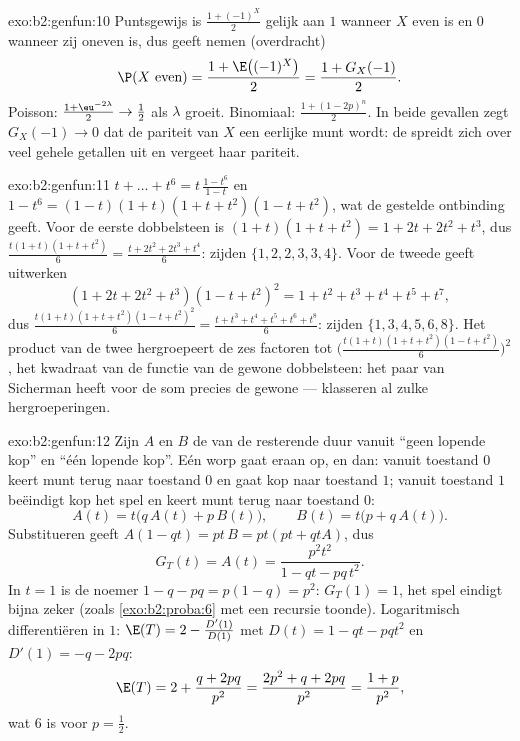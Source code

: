 \begin{solution}{exo:b2:genfun:10}
Puntsgewijs is $\frac{1 + (-1)^X}{2}$ gelijk aan $1$ wanneer $X$
even is en $0$ wanneer zij oneven is, dus geeft 
nemen (overdracht)
\[
\P(X \text{ even}) = \frac{1 + \E\bigl((-1)^X\bigr)}2 =
\frac{1 + G_X(-1)}2 .
\]
Poisson: $\frac{1 + \eu^{-2\lambda}}2 \to \frac12$ als $\lambda$
groeit. Binomiaal: $\frac{1 + (1 - 2p)^n}2$. In beide gevallen zegt
$G_X(-1) \to 0$ dat de pariteit van $X$ een eerlijke munt wordt: de
 spreidt zich over veel gehele getallen uit en vergeet
haar pariteit.
\end{solution}

\begin{solution}{exo:b2:genfun:11}
$t + \dots + t^6 = t\,\frac{1 - t^6}{1 - t}$ en $1 - t^6 = (1 -
t)(1 + t)(1 + t + t^2)(1 - t + t^2)$, wat de gestelde ontbinding
geeft. Voor de eerste dobbelsteen is $(1 + t)(1 + t + t^2) = 1 + 2t
+ 2t^2 + t^3$, dus $\frac{t(1+t)(1+t+t^2)}6 = \frac{t + 2t^2 +
2t^3 + t^4}6$: zijden $\{1, 2, 2, 3, 3, 4\}$. Voor de tweede geeft
uitwerken
\[
(1 + 2t + 2t^2 + t^3)(1 - t + t^2)^2 = 1 + t^2 + t^3 + t^4 +
t^5 + t^7,
\]
dus $\frac{t(1+t)(1+t+t^2)(1-t+t^2)^2}6 = \frac{t + t^3 + t^4 +
t^5 + t^6 + t^8}6$: zijden $\{1, 3, 4, 5, 6, 8\}$. Het product van
de twee  hergroepeert de zes factoren tot
$\bigl(\frac{t(1+t)(1+t+t^2)(1-t+t^2)}6 \bigr)^2$, het kwadraat van
de functie van de gewone dobbelsteen: het paar van Sicherman heeft
voor de som precies de gewone  --- 
klasseren al zulke hergroeperingen.
\end{solution}

\begin{solution}{exo:b2:genfun:12}
Zijn $A$ en $B$ de  van de resterende duur
vanuit ``geen lopende kop'' en ``één lopende kop''. Eén worp gaat
eraan op, en dan: vanuit toestand $0$ keert munt terug naar
toestand $0$ en gaat kop naar toestand $1$; vanuit toestand $1$
beëindigt kop het spel en keert munt terug naar toestand $0$:
\[
A(t) = t\bigl(q\,A(t) + p\,B(t)\bigr),
\qquad
B(t) = t\bigl(p + q\,A(t)\bigr).
\]
Substitueren geeft $A(1 - qt) = pt\,B = pt(pt + qtA)$, dus
\[
G_T(t) = A(t) = \frac{p^2t^2}{1 - qt - pq\,t^2} .
\]
In $t = 1$ is de noemer $1 - q - pq = p(1 - q) = p^2$: $G_T(1) =
1$, het spel eindigt bijna zeker (zoals \cref{exo:b2:proba:6} met
een recursie toonde). Logaritmisch differentiëren in $1$: $\E(T) =
2 - \frac{D'(1)}{D(1)}$ met $D(t) = 1 - qt - pqt^2$ en $D'(1) = -q
- 2pq$:
\[
\E(T) = 2 + \frac{q + 2pq}{p^2} = \frac{2p^2 + q + 2pq}{p^2}
= \frac{1 + p}{p^2},
\]
wat $6$ is voor $p = \frac12$.
\end{solution}

